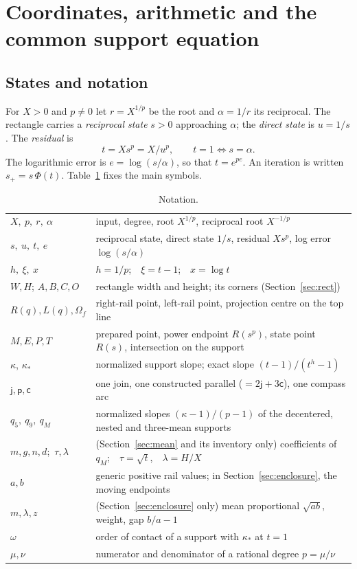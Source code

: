 \documentclass[10pt,a4paper]{article}
\theoremstyle{plain}
\theoremstyle{remark}
\numberwithin{equation}{section}
\newcommand{\jn}{\mathsf{j}}          %
\newcommand{\pl}{\mathsf{p}}          %
\newcommand{\ar}{\mathsf{c}}          %
\newcommand{\Om}{\Omega}              %
\begin{document}
\section{Coordinates, arithmetic and the common support equation}\label{sec:coords}

\subsection{States and notation}

For $X>0$ and $p\neq 0$ let $r=X^{1/p}$ be the root and $\alpha=1/r$ its reciprocal. The rectangle
carries a \emph{reciprocal state} $s>0$ approaching $\alpha$; the \emph{direct state} is $u=1/s$. The
\emph{residual} is
\[ t=Xs^{p}=X/u^{p}, \qquad t=1 \iff s=\alpha . \]
The logarithmic error is $e=\log(s/\alpha)$, so that $t=e^{pe}$. An iteration is written
$s_+=s\,\Phi(t)$. Table~\ref{tab:notation} fixes the main symbols.

\begin{table}[h]
\centering\small
\caption{Notation.}\label{tab:notation}
\begin{tabularx}{\linewidth}{@{}lX@{}}
\toprule
$X,\ p,\ r,\ \alpha$ & input, degree, root $X^{1/p}$, reciprocal root $X^{-1/p}$\\
$s,\ u,\ t,\ e$ & reciprocal state, direct state $1/s$, residual $Xs^p$, log error $\log(s/\alpha)$\\
$h,\ \xi,\ x$ & $h=1/p$;\ \ $\xi=t-1$;\ \ $x=\log t$\\
$W,H$; $A,B,C,O$ & rectangle width and height; its corners (Section~\ref{sec:rect})\\
$R(q),L(q),\Om_f$ & right-rail point, left-rail point, projection centre on the top line\\
$M,E,P,T$ & prepared point, power endpoint $R(s^{p})$, state point $R(s)$, intersection on the support\\
$\kappa$, $\kappa_*$ & normalized support slope; exact slope $(t-1)/(t^{h}-1)$\\
$\jn,\pl,\ar$ & one join, one constructed parallel ($=2\jn+3\ar$), one compass arc\\
$q_5,\ q_9,\ q_M$ & normalized slopes $(\kappa-1)/(p-1)$ of the decentered, nested and three-mean supports\\
$m,g,n,d$;\ $\tau,\lambda$ & (Section~\ref{sec:mean} and its inventory only) coefficients of $q_M$;\ \ $\tau=\sqrt t$,\ \ $\lambda=H/X$\\
$a,b$ & generic positive rail values; in Section~\ref{sec:enclosure}, the moving endpoints\\
$m,\lambda,z$ & (Section~\ref{sec:enclosure} only) mean proportional $\sqrt{ab}$, weight, gap $b/a-1$\\
$\omega$ & order of contact of a support with $\kappa_*$ at $t=1$\\
$\mu,\nu$ & numerator and denominator of a rational degree $p=\mu/\nu$\\
\bottomrule
\end{tabularx}
\end{table}
\end{document}
